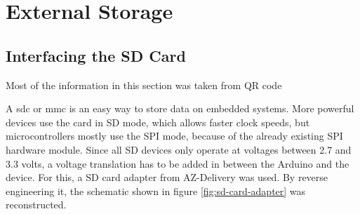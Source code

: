\setchapterpreamble[u]{\margintoc}

\chapter{External Storage}

\section{Interfacing the SD Card}
\label{sec:interfacing-the-sd-card}

Most of the information in this section was taken from QR code 

A \gls{sdc} or \gls{mmc} is an easy way to store data on embedded systems. More powerful devices use the card in SD mode, which allows faster clock speeds, but microcontrollers mostly use the SPI mode, because of the already existing SPI hardware module. Since all SD devices only operate at voltages between 2.7 and 3.3 volts, a voltage translation has to be added in between the Arduino and the device. For this, a SD card adapter from AZ-Delivery was used. By reverse engineering it, the schematic shown in figure \ref{fig:sd-card-adapter} was reconstructed.

